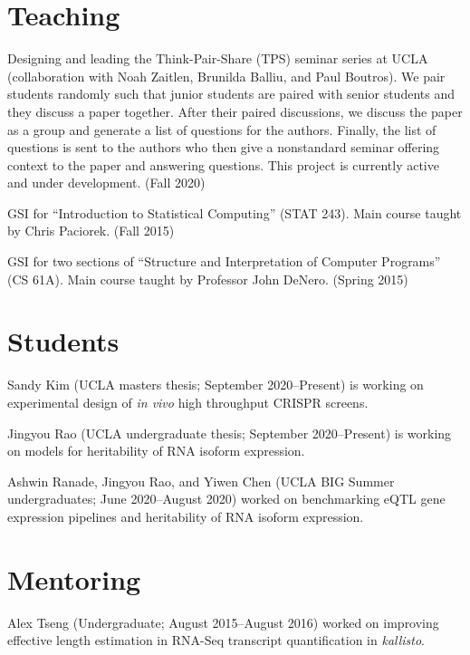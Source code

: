 \documentclass[11pt,notitlepage]{article} %
\begin{document}

\bigskip
\section*{Teaching}
Designing and leading the Think-Pair-Share (TPS) seminar series at UCLA (collaboration with Noah Zaitlen, Brunilda Balliu, and Paul Boutros).
We pair students randomly such that junior students are paired with senior students and they discuss a paper together.
After their paired discussions, we discuss the paper as a group and generate a list of questions for the authors.
Finally, the list of questions is sent to the authors who then give a nonstandard seminar offering context to the paper and answering questions.
This project is currently active and under development.
(Fall 2020)

\medskip

GSI for ``Introduction to Statistical Computing'' (STAT 243). Main course taught
by Chris Paciorek. (Fall 2015)

\medskip

GSI for two sections of ``Structure and Interpretation of Computer Programs''
(CS 61A). Main course taught by Professor John DeNero. (Spring 2015)

\bigskip
\section*{Students}

Sandy Kim (UCLA masters thesis; September 2020--Present) is working on experimental design of \textit{in vivo} high throughput CRISPR screens.

\medskip
Jingyou Rao (UCLA undergraduate thesis; September 2020--Present) is working on models for heritability of RNA isoform expression.

\medskip

Ashwin Ranade, Jingyou Rao, and Yiwen Chen (UCLA BIG Summer undergraduates; June 2020--August 2020) worked on benchmarking eQTL gene expression pipelines and heritability of RNA isoform expression.

\bigskip
\section*{Mentoring}
Alex Tseng (Undergraduate; August 2015--August 2016) worked on improving effective length estimation in RNA-Seq transcript quantification in \emph{kallisto}.
\end{document}
